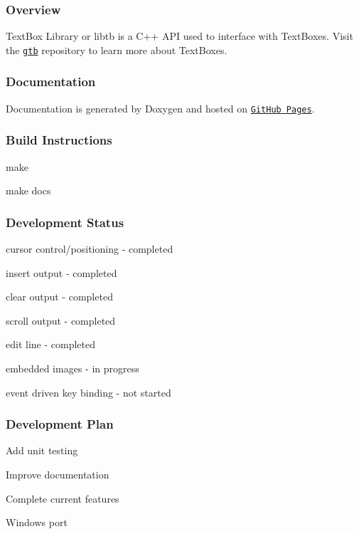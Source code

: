 \subsubsection*{Overview}

Text\+Box Library or \textquotesingle{}libtb\textquotesingle{} is a C++ A\+PI used to interface with Text\+Boxes. Visit the \href{https://codrod.github.io/gtb/index.html}{\tt gtb} repository to learn more about Text\+Boxes.

\subsubsection*{Documentation}

Documentation is generated by Doxygen and hosted on \href{https://codrod.github.io/libtb/index.html}{\tt Git\+Hub Pages}.

\subsubsection*{Build Instructions}


\begin{DoxyItemize}
\item make
\item make docs
\end{DoxyItemize}

\subsubsection*{Development Status}


\begin{DoxyItemize}
\item cursor control/positioning -\/ completed
\item insert output -\/ completed
\item clear output -\/ completed
\item scroll output -\/ completed
\item edit line -\/ completed
\item embedded images -\/ in progress
\item event driven key binding -\/ not started
\end{DoxyItemize}

\subsubsection*{Development Plan}


\begin{DoxyEnumerate}
\item Add unit testing
\item Improve documentation
\item Complete current features
\item Windows port 
\end{DoxyEnumerate}
